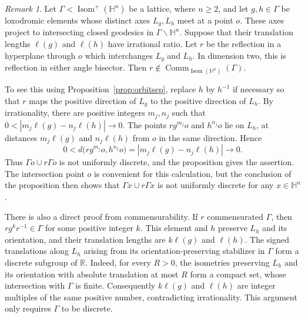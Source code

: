 \documentclass[reqno]{amsart}
\theoremstyle{remark}
\newtheorem{remark}[theorem]{Remark}
\DeclareMathOperator{\Comm}{Comm}
\begin{document}
\begin{remark}\label{rem:bisector}
Let $\Gamma<\operatorname{Isom}^+(\mathbb H^n)$ be a lattice, where $n\ge2$, and let $g,h\in\Gamma$ be loxodromic elements whose distinct axes $L_g,L_h$ meet at a point $o$. These axes project to intersecting closed geodesics in $\Gamma\backslash\mathbb H^n$. Suppose that their translation lengths $\ell(g)$ and $\ell(h)$ have irrational ratio. Let $r$ be the reflection in a hyperplane through $o$ which interchanges $L_g$ and $L_h$. In dimension two, this is reflection in either angle bisector. Then $r\notin\Comm_{\operatorname{Isom}(\mathbb H^n)}(\Gamma)$.

To see this using Proposition~\ref{prop:orbitsep}, replace $h$ by $h^{-1}$ if necessary so that $r$ maps the positive direction of $L_g$ to the positive direction of $L_h$. By irrationality, there are positive integers $m_j,n_j$ such that $0<|m_j\ell(g)-n_j\ell(h)|\longrightarrow0$. The points $rg^{m_j}o$ and $h^{n_j}o$ lie on $L_h$, at distances $m_j\ell(g)$ and $n_j\ell(h)$ from $o$ in the same direction. Hence
$$
0<d\bigl(rg^{m_j}o,h^{n_j}o\bigr)
=|m_j\ell(g)-n_j\ell(h)|\longrightarrow0.
$$
Thus $\Gamma o\cup r\Gamma o$ is not uniformly discrete, and the proposition gives the assertion. The intersection point $o$ is convenient for this calculation, but the conclusion of the proposition then shows that $\Gamma x\cup r\Gamma x$ is not uniformly discrete for any $x\in\mathbb H^n$.

There is also a direct proof from commensurability. If $r$ commensurated $\Gamma$, then $rg^kr^{-1}\in\Gamma$ for some positive integer $k$. This element and $h$ preserve $L_h$ and its orientation, and their translation lengths are $k\ell(g)$ and $\ell(h)$. The signed translations along $L_h$ arising from its orientation-preserving stabilizer in $\Gamma$ form a discrete subgroup of $\mathbb R$. Indeed, for every $R>0$, the isometries preserving $L_h$ and its orientation with absolute translation at most $R$ form a compact set, whose intersection with $\Gamma$ is finite. Consequently $k\ell(g)$ and $\ell(h)$ are integer multiples of the same positive number, contradicting irrationality. This argument only requires $\Gamma$ to be discrete. \end{remark}
\end{document}
